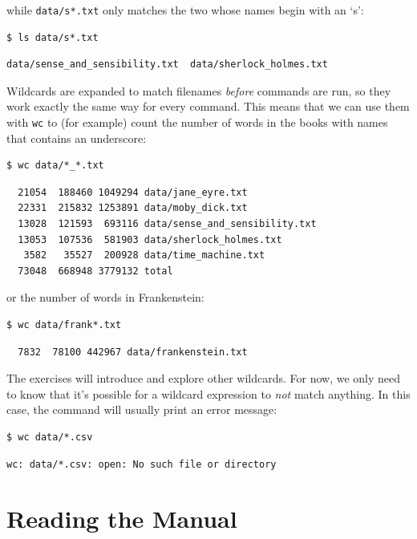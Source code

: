\documentclass[
]{krantz}
\begin{document}
while \texttt{data/s*.txt} only matches the two whose names begin with an `s':

\begin{verbatim}
$ ls data/s*.txt
\end{verbatim}

\begin{verbatim}
data/sense_and_sensibility.txt  data/sherlock_holmes.txt
\end{verbatim}

Wildcards are expanded to match filenames \emph{before} commands are run,
so they work exactly the same way for every command.
This means that we can use them with \texttt{wc} to (for example)
count the number of words in the books with names that contains an underscore:

\begin{verbatim}
$ wc data/*_*.txt
\end{verbatim}

\begin{verbatim}
  21054  188460 1049294 data/jane_eyre.txt
  22331  215832 1253891 data/moby_dick.txt
  13028  121593  693116 data/sense_and_sensibility.txt
  13053  107536  581903 data/sherlock_holmes.txt
   3582   35527  200928 data/time_machine.txt
  73048  668948 3779132 total
\end{verbatim}

or the number of words in Frankenstein:

\begin{verbatim}
$ wc data/frank*.txt
\end{verbatim}

\begin{verbatim}
  7832  78100 442967 data/frankenstein.txt
\end{verbatim}

The exercises will introduce and explore other wildcards.
For now,
we only need to know that
it's possible for a wildcard expression to \emph{not} match anything.
In this case,
the command will usually print an error message:

\begin{verbatim}
$ wc data/*.csv
\end{verbatim}

\begin{verbatim}
wc: data/*.csv: open: No such file or directory
\end{verbatim}

\hypertarget{bash-basics-help}{%
\section{Reading the Manual}\label{bash-basics-help}}
\end{document}
